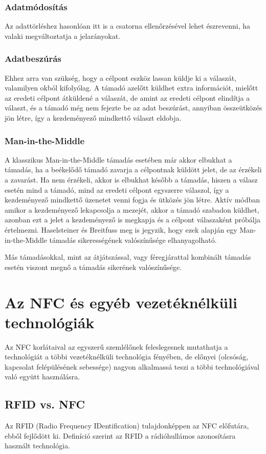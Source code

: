 \documentclass[12pt]{article}
\begin{document}
\subsubsection{Adatmódosítás}
Az adattörléshez hasonlóan itt is a csatorna ellenőrzésével lehet észrevenni,
ha valaki megváltoztatja a jelarányokat.

\subsubsection{Adatbeszúrás}
Ehhez arra van szükség, hogy a célpont eszköz lassan küldje ki a válaszát, 
valamilyen okból kifolyólag. A támadó azelőtt küldhet extra információt, mielőtt
az eredeti célpont átküldené a válaszát, de amint az eredeti célpont elindítja a
választ, és a támadó még nem fejezte be az adat beszúrást, annyiban összeütközés
jön létre, így a kezdeményező mindkettő választ eldobja.

\subsubsection{Man-in-the-Middle}
A klasszikus Man-in-the-Middle támadás esetében már akkor elbukhat
a támadás, ha a beékelődő támadó zavarja a célpontnak küldött jelet, de az
érzékeli a zavarást. Ha nem érzékeli, akkor is elbukhat később a támadás, 
hiszen a válasz esetén mind a támadó, mind az eredeti célpont egyszerre válaszol,
így a kezdeményező mindkettő üzenetet venni fogja és ütközés jön létre.
Aktív módban amikor a kezdeményező lekapcsolja a mezejét, akkor a támadó szabadon
küldhet, azonban ezt a jelet a kezdeményező is megkapja és a célpont válaszaként
próbálja értelmezni. Haselsteiner és Breitfuss meg is jegyzik, hogy ezek alapján
egy Man-in-the-Middle támadás sikerességének valószínűsége elhanyagolható.

Más támadásokkal, mint az átjátszással, vagy féregjárattal kombinált támadás
esetén viszont megnő a támadás sikerének valószínűsége.

\section{Az NFC és egyéb vezetéknélküli technológiák}
Az NFC korlátaival az egyszerű szemlélőnek feleslegesnek mutathatja a 
technológiát a többi vezetéknélküli technológia fényében, de előnyei 
(olcsóság, kapcsolat felépülésének sebessége)
nagyon alkalmassá teszi a többi technológiával való együtt használásra.

\subsection{RFID vs. NFC}
Az RFID (Radio Frequency IDentification) tulajdonképpen az NFC előfutára, ebből
fejlődött ki. Definíció szerint az RFID a rádióhullámos azonosításra használt technológia.
\end{document}
